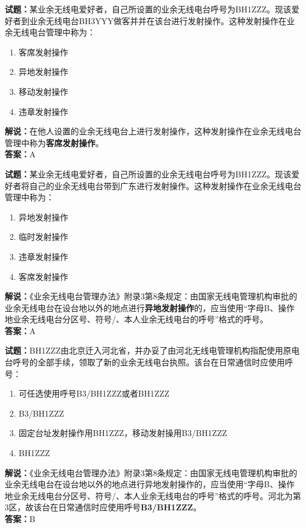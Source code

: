 \documentclass{ctexbook}
\begin{document}
\vspace{\baselineskip}

\noindent\textbf{试题：}某业余无线电爱好者，自己所设置的业余无线电台呼号为BH1ZZZ。现该爱好者到业余无线电台BH3YYY做客并并在该台进行发射操作。这种发射操作在业余无线电台管理中称为：
\begin{enumerate}[leftmargin=3em]
  \item 客席发射操作
  \item 异地发射操作
  \item 移动发射操作
  \item 违章发射操作
\end{enumerate}
\noindent\textbf{解说：}在他人设置的业余无线电台上进行发射操作，这种发射操作在业余无线电台管理中称为\textbf{客席发射操作}。\\\noindent\textbf{答案：}A

\vspace{\baselineskip}

\noindent\textbf{试题：}某业余无线电爱好者，自己所设置的业余无线电台呼号为BH1ZZZ。现该爱好者将自己的业余无线电台带到广东进行发射操作。这种发射操作在业余无线电台管理中称为：
\begin{enumerate}[leftmargin=3em]
  \item 异地发射操作
  \item 临时发射操作
  \item 违章发射操作
  \item 客席发射操作
\end{enumerate}
\noindent\textbf{解说：}《业余无线电台管理办法》附录3第8条规定：由国家无线电管理机构审批的业余无线电台在设台地以外的地点进行\textbf{异地发射操作}的，应当使用“字母B、操作地业余无线电台分区号、符号/、本人业余无线电台的呼号”格式的呼号。\\\noindent\textbf{答案：}A

\vspace{\baselineskip}

\noindent\textbf{试题：}BH1ZZZ由北京迁入河北省，并办妥了由河北无线电管理机构指配使用原电台呼号的全部手续，领取了新的业余无线电台执照。该台在日常通信时应使用呼号：
\begin{enumerate}[leftmargin=3em]
  \item 可任选使用呼号B3/BH1ZZZ或者BH1ZZZ
  \item B3/BH1ZZZ
  \item 固定台址发射操作用BH1ZZZ，移动发射操用B3/BH1ZZZ
  \item BH1ZZZ
\end{enumerate}
\noindent\textbf{解说：}《业余无线电台管理办法》附录3第8条规定：由国家无线电管理机构审批的业余无线电台在设台地以外的地点进行异地发射操作的，应当使用“字母B、操作地业余无线电台分区号、符号/、本人业余无线电台的呼号”格式的呼号。河北为第3区，故该台在日常通信时应使用呼号\textbf{B3/BH1ZZZ}。\\\noindent\textbf{答案：}B
\end{document}
